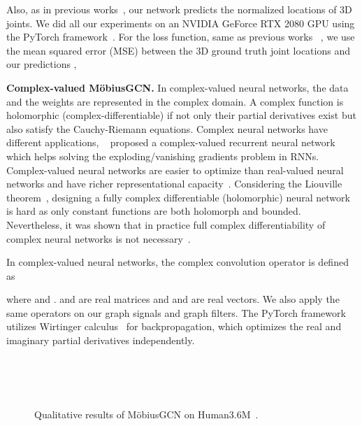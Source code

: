 \documentclass[runningheads]{llncs}
\begin{document}
Also, as in previous works~\cite{martinez2017simple, zhaoCVPR19semantic, pavlakos2017coarse, liu2020comprehensive}, our network predicts the normalized locations of 3D joints. We did all our experiments on an NVIDIA GeForce RTX 2080 GPU using the PyTorch framework~\cite{NEURIPS2019_9015}.
For the loss function, same as previous works \emph{\eg}~\cite{martinez2017simple, pavllo20193d}, we use the mean squared error (MSE) between the 3D ground truth joint locations  and our predictions , \ie



\textbf{Complex-valued M\"obiusGCN.} In complex-valued neural networks, the data and the weights are represented in the complex domain. A complex function is holomorphic (complex-differentiable) if not only their partial derivatives exist but also satisfy the Cauchy-Riemann equations. Complex neural networks have different applications, \eg~\citet{wolter2018complex} proposed a complex-valued recurrent neural network which helps solving the exploding/vanishing gradients problem in RNNs. 
Complex-valued neural networks are easier to optimize than real-valued neural networks and have richer representational capacity~\cite{trabelsi2018deep}. Considering the Liouville theorem~\cite{mandic2009complex}, designing a fully complex differentiable (holomorphic) neural network is hard as only constant functions are both holomorph and bounded. Nevertheless, it was shown that in practice full complex differentiability of complex neural networks is not necessary~\cite{trabelsi2018deep}.

In complex-valued neural networks, the complex convolution operator is defined as 

where  and .  and  are real matrices and  and  are real vectors. 
We also apply the same operators on our graph signals and graph filters.
The PyTorch framework~\cite{NEURIPS2019_9015} utilizes Wirtinger calculus~\cite{kreutz2009complex} for backpropagation, which  optimizes the real and imaginary partial derivatives independently. 


\begin{figure*}
\centering
{}
\quad
{}
\quad
{}\\
\quad
{}
\quad
{}\\
\quad
{}
\quad
{}\\
\caption{Qualitative results of M\"obiusGCN on Human3.6M~\cite{h36m_pami}.}
\label{qual-res}
\end{figure*}
\end{document}
